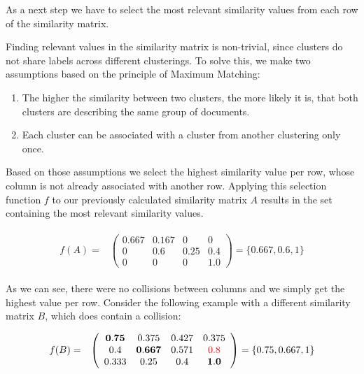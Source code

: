 As a next step we have to select the most relevant similarity values from each row of the similarity matrix.

Finding relevant values in the similarity matrix is non-trivial,
since clusters do not share labels across different clusterings.
To solve this, we make two assumptions based on the principle of Maximum Matching:

\begin{enumerate}
    \item The higher the similarity between two clusters,
          the more likely it is, that both clusters are describing the same group of documents.
    \item Each cluster can be associated with a cluster from another clustering only once.
\end{enumerate}

Based on those assumptions we select the highest similarity value per row,
whose column is not already associated with another row.
Applying this selection function $f$ to our previously calculated similarity matrix $A$
results in the set containing the most relevant similarity values.

\begin{gather*}
    \begin{array}{rcl}
        f(A) = & \left(\begin{array}{cccc}
            \mathbf{0.667} & 0.167 & 0 & 0 \\
            0 & \mathbf{0.6} & 0.25 & 0.4 \\
            0 &  0 & 0 & \mathbf{1.0} \end{array}\right)
            = \{0.667, 0.6, 1\}
    \end{array}
\end{gather*}

As we can see, there were no collisions between columns and we simply get the highest value per row.
Consider the following example with a different similarity matrix $B$, which does contain a collision:

\begin{gather*}
    \begin{array}{rcl}
        f(B) = & \left(\begin{array}{cccc}
            \mathbf{0.75} & 0.375 & 0.427 & 0.375 \\
            0.4 & \mathbf{0.667} & 0.571 & \textcolor{red}{0.8} \\
            0.333 &  0.25 & 0.4 & \mathbf{1.0} \end{array}\right)
            = \{0.75, 0.667, 1\}
    \end{array}
\end{gather*}

